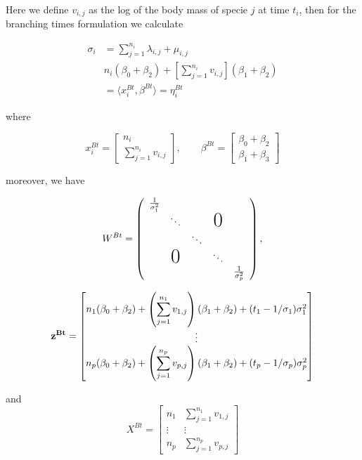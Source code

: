 Here we define $v_{i,j}$ as the log of the body mass of specie $j$ at time $t_i$, then for the branching times formulation we calculate 

\begin{equation}
\begin{aligned}
 \sigma_i & = \displaystyle\sum_{j=1}^{n_i} \lambda_{i,j} + \mu_{i,j} \\
 & n_i(\beta_0 + \beta_2) + \left[ \displaystyle\sum_{j=1}^{n_i} v_{i,j} \right](\beta_1 + \beta_2) \\
 & = \langle x_i^{Bt}, \beta^{Bt} \rangle = \eta_i^{Bt} \end{aligned} \end{equation} 

where

$$ 
 x_i^{Bt}=
  \begin{bmatrix}
    n_i \\
  \displaystyle\sum_{j=1}^{n_i} v_{i,j}
  \end{bmatrix}, \qquad \beta^{Bt}=
  \begin{bmatrix}
    \beta_0 + \beta_2 \\
   \beta_1 + \beta_3 \end{bmatrix}
$$ 

moreover, we have 

\[
W^{Bt} = \left(
 \begin{array}{ccccc}
   \frac{1}{\sigma_1^2}\\
    & \ddots & & \text{\huge0}\\
    & & \ddots\\
    & \text{\huge0} & & \ddots\\
    & & & & \frac{1}{\sigma_p^2}
 \end{array}
\right),
\]

$$\bf{z}^{Bt} = \begin{bmatrix}
     n_1(\beta_0 + \beta_2) + \left( \displaystyle\sum_{j=1}^{n_1} v_{1,j} \right)(\beta_1 + \beta_2) +(t_1-1/ \sigma_1)\sigma_1^2\\
   \vdots \\
  n_p(\beta_0 + \beta_2) + \left( \displaystyle\sum_{j=1}^{n_p} v_{p,j} \right)(\beta_1 + \beta_2) +(t_p-1/ \sigma_p)\sigma_p^2
  \end{bmatrix}
$$

and
$$ 
 X^{Bt}=
  \begin{bmatrix}
    n_1 &    \displaystyle\sum_{j=1}^{n_1} v_{1,j} \\
    \vdots & \vdots \\
    n_p &  \displaystyle\sum_{j=1}^{n_p} v_{p,j}
  \end{bmatrix}
$$ 

